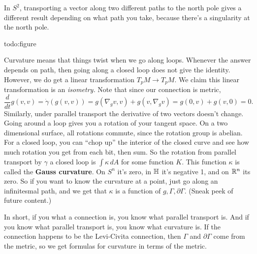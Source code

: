     \begin{example}
        In $S^2$, transporting a vector along two different paths to the north pole gives a different result depending on what path you take, because there's a singularity at the north pole. 

        {\color{red}todo:figure} 

        Curvature means that things twist when we go along loops. Whenever the answer depends on path, then going along a closed loop does not give the identity. However, we do get a linear transformation $T_p M\to T_p M$. We claim this linear transformation is an \emph{isometry.} Note that since our connection is metric,
        \[
            \frac{d}{dt}g(v,v)=\dot \gamma (g(v,v))=g(\nabla_gv,v)+g(v,\nabla_g v)=g(0,v)+g(v,0)=0.
        \] Similarly, under parallel transport the derivative of two vectors doesn't change. Going around a loop gives you a rotation of your tangent space. On a two dimensional surface, all rotations commute, since the rotation group is abelian. For a closed loop, you can ``chop up'' the interior of the closed curve and see how much rotation you get from each bit, then sum. So the rotation from parallel transport by $\gamma $ a closed loop is $\int \kappa \, dA$ for some function $K$. This function $\kappa$ is called the \textbf{Gauss curvature}. On $S^n $ it's zero, in $\mathbb{H}$ it's negative 1, and on $\mathbb{R}^n $ its zero. So if you want to know the curvature at a point, just go along an infinitesmal path, and we get that $\kappa$ is a function of $g, \Gamma ,\partial \Gamma $. (Sneak peek of future content.)
    \end{example}
    In short, if you what a connection is, you know what parallel transport is. And if you know what parallel transport is, you know what curvature is. If the connection happens to be the Levi-Civita connection, then $\Gamma $ and $\partial \Gamma $ come from the metric, so we get formulas for curvature in terms of the metric.

